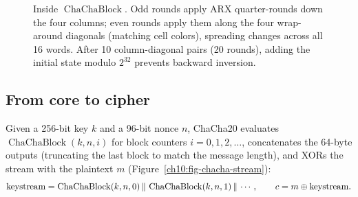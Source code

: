 \begin{figure}[htbp]
\caption{Inside $\operatorname{ChaChaBlock}$. Odd rounds apply ARX quarter-rounds down the four columns; even rounds apply them along the four wrap-around diagonals (matching cell colors), spreading changes across all 16 words. After 10 column-diagonal pairs (20 rounds), adding the initial state modulo $2^{32}$ prevents backward inversion.}
\label{ch10:fig-chacha-qr}
\end{figure}

\subsection{From core to cipher}
\label{ch10:chacha-cipher}

Given a 256-bit key $k$ and a 96-bit nonce $n$, ChaCha20 evaluates $\operatorname{ChaChaBlock}(k, n, i)$ for block counters $i = 0, 1, 2, \dots$, concatenates the 64-byte outputs (truncating the last block to match the message length), and XORs the stream with the plaintext $m$ (Figure~\ref{ch10:fig-chacha-stream}):
\[
  \text{keystream} = \operatorname{ChaChaBlock}(k, n, 0) \,\|\, \operatorname{ChaChaBlock}(k, n, 1) \,\|\, \cdots,
  \qquad
  c = m \oplus \text{keystream}.
\]

